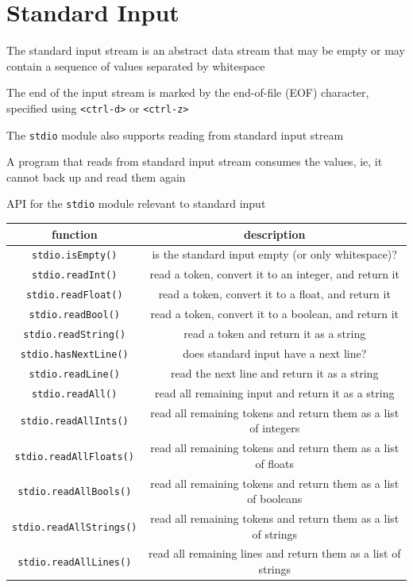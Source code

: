 \documentclass[8pt,a4paper,compress]{beamer}
\begin{document}
\section{Standard Input}
\begin{frame}[fragile]
\pause

The standard input stream is an abstract data stream that may be empty or may contain a sequence of values separated by whitespace 

\pause\bigskip

The end of the input stream is marked by the end-of-file (EOF) character, specified using \lstinline$<ctrl-d>$ or \lstinline$<ctrl-z>$ 

\pause\bigskip

The \lstinline{stdio} module also supports reading from standard input stream

\pause\bigskip

A program that reads from standard input stream consumes the values, ie, it cannot back up and read them again
\end{frame}

\begin{frame}[fragile]
\pause

API for the \lstinline{stdio} module relevant to standard input
\begin{center}
\begin{tabular}{cc}
function & description \\ \hline
\lstinline$stdio.isEmpty()$ & is the standard input empty (or only whitespace)? \\
\lstinline$stdio.readInt()$ & read a token, convert it to an integer, and return it \\
\lstinline$stdio.readFloat()$ & read a token, convert it to a float, and return it \\
\lstinline$stdio.readBool()$ & read a token, convert it to a boolean, and return it \\
\lstinline$stdio.readString()$ & read a token and return it as a string \\
\lstinline$stdio.hasNextLine()$ & does standard input have a next line? \\
\lstinline$stdio.readLine()$ & read the next line and return it as a string \\
\lstinline$stdio.readAll()$ & read all remaining input and return it as a string \\
\lstinline$stdio.readAllInts()$ & read all remaining tokens and return them as a list of integers \\
\lstinline$stdio.readAllFloats()$ & read all remaining tokens and return them as a list of floats \\
\lstinline$stdio.readAllBools()$ & read all remaining tokens and return them as a list of booleans \\
\lstinline$stdio.readAllStrings()$ & read all remaining tokens and return them as a list of strings \\
\lstinline$stdio.readAllLines()$ & read all remaining lines and return them as a list of strings
\end{tabular} 
\end{center}
\end{frame}
\end{document}

